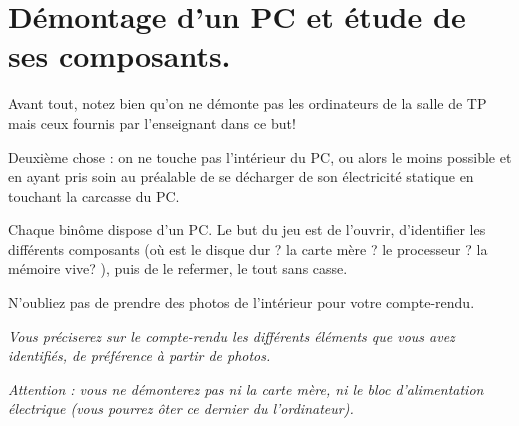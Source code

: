 \section{Démontage d'un PC et étude de ses composants.}\label{sec.demontage}

Avant tout, notez bien qu'on ne démonte pas les ordinateurs de la
salle de TP mais ceux fournis par l'enseignant dans ce but!

Deuxième chose : on ne touche pas l'intérieur du PC, ou alors le moins
possible et  en ayant pris  soin au préalable  de se décharger  de son
électricité statique en touchant la carcasse du PC.

Chaque  binôme  dispose  d'un PC.  Le  but  du  jeu est  de  l'ouvrir,
d'identifier  les différents  composants (où  est le  disque dur ? la
carte mère ? le processeur ?  la mémoire vive? ), puis de le refermer,
le tout sans casse.

N'oubliez pas de prendre des photos de l'intérieur pour votre
compte-rendu.

\emph{Vous préciserez sur le compte-rendu les différents éléments
  que vous avez identifiés, de préférence à partir de photos.}

\emph{Attention : vous ne démonterez pas ni la carte mère, ni le bloc d'alimentation électrique (vous pourrez ôter ce dernier du l'ordinateur).}  
